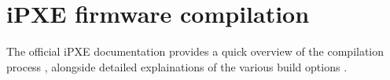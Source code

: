 \documentclass[../main.tex]{subfiles}
\begin{document}
\section{iPXE firmware compilation}

The official iPXE documentation provides a quick overview of the compilation process \cite{ipxe_compilation_guide},
alongside detailed explainations of the various build options \cite{ipxe_build_options}.
\end{document}
